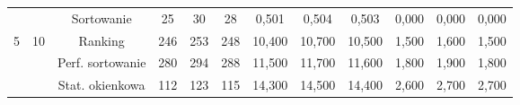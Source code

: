 \documentclass[magisterska]{pracamgr}
\begin{document}
\begin{table}[H]
{\begin{tabular}{@{}cccccccccccc@{}}
                                                               &                                                        & Sortowanie    & 25                                                     & 30                                                     & 28                                                        & 0,501                                                     & 0,504                                                      & 0,503                                                         & 0,000                                                              & 0,000                                                               & 0,000                                                                 \\
5                                                              & 10                                                     & Ranking    & 246                                                    & 253                                                    & 248                                                       & 10,400                                                    & 10,700                                                     & 10,500                                                        & 1,500                                                              & 1,600                                                               & 1,500                                                                 \\
                                                               &                                                        & Perf. sortowanie    & 280                                                    & 294                                                    & 288                                                       & 11,500                                                    & 11,700                                                     & 11,600                                                        & 1,800                                                              & 1,900                                                               & 1,800                                                                 \\
                                                               &                                                        & Stat. okienkowa    & 112                                                    & 123                                                    & 115                                                       & 14,300                                                    & 14,500                                                     & 14,400                                                        & 2,600                                                              & 2,700                                                               & 2,700                                                                 \\ \bottomrule
\end{tabular}%
}
\end{table}
\end{document}
